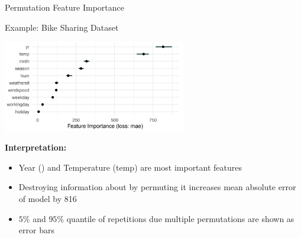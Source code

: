 \documentclass[11pt,compress,t,notes=noshow, aspectratio=169, xcolor=table]{beamer}
\begin{document}
\begin{frame}{Permutation Feature Importance}
\begin{itemize}
  \end{itemize}
\end{frame}

\begin{frame}{Example: Bike Sharing Dataset}

\begin{center}
\includegraphics[width=0.6\textwidth]{figure_man/bike-sharing02.png}
\end{center}

\textbf{Interpretation:}

\begin{itemize}
 \item Year () and Temperature (temp) are most important features
 \item Destroying information about  by permuting it increases mean absolute error of model by 816
 \item $5 \%$ and $95 \%$ quantile of repetitions due multiple permutations are shown as error bars
\end{itemize}
\end{frame}
\end{document}
